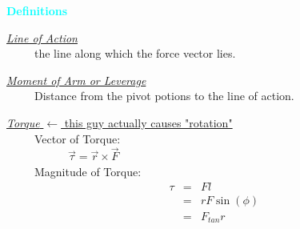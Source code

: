 \documentclass[12pt,letterpaper,fleqn]{article}
\begin{document}
\begin{flushleft}
\textcolor{cyan}{\large\bf Definitions} 
\end{flushleft}
\begin{flushleft}

\underline{\large\it Line of Action}\\ 
\ \ \ \ \ the line along which the force vector lies.

\underline{\large\it Moment of Arm or Leverage}\\
\ \ \ \ \ Distance from the pivot potions to the line of action.


\underline{{\large\it Torque} \tiny$\leftarrow$  this guy actually causes "rotation"}\\
\ \ \ \ \ Vector of Torque:\\
\ \ \ \ \ \ \ \ \ \ \ $\vec{\tau} = \vec{r}\times\vec{F}$\\
\ \ \ \ \ Magnitude of Torque: 
\begin{eqnarray}
\ \ \ \ \  \tau &=& Fl \nonumber \\
&=& rF\sin(\phi) \nonumber \\
&=& F_{tan}r \nonumber \\
\end{eqnarray} 


\end{flushleft}






\end{document}
